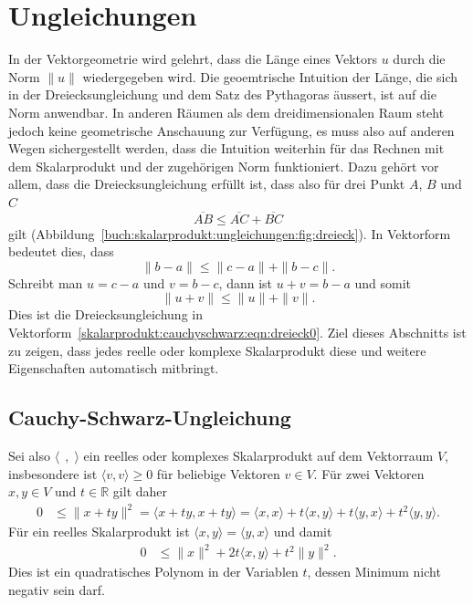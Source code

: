 %
%
%
\section{Ungleichungen
\label{buch:skalarprodukte:section:cauchyschwarz}}

In der Vektorgeometrie wird gelehrt, dass die Länge eines Vektors $u$
durch die Norm $\|u\|$ wiedergegeben wird.
Die geoemtrische Intuition der Länge, die sich in der Dreiecksungleichung
und dem Satz des Pythagoras äussert, ist auf die Norm anwendbar.
In anderen Räumen als dem dreidimensionalen Raum steht
jedoch keine geometrische Anschauung zur Verfügung, es muss also
auf anderen Wegen sichergestellt werden, dass die Intuition weiterhin
für das Rechnen mit dem Skalarprodukt und der zugehörigen Norm
funktioniert.
Dazu gehört vor allem, dass die Dreiecksungleichung erfüllt ist,
dass also für drei Punkt $A$, $B$ und $C$
\begin{equation}
\overline{AB} \le \overline{AC} + \overline{BC}
\label{skalarprodukt:ungleichungen:eqn:dreieck}
\end{equation}
gilt (Abbildung~\ref{buch:skalarprodukt:ungleichungen:fig:dreieck}).
In Vektorform bedeutet dies, dass
\[
\| b-a\|
\le
\| c-a\| + \|b-c\|.
\]
Schreibt man $u=c-a$ und $v=b-c$, dann ist $u+v=b-a$ und somit
\begin{equation}
\| u+v\| \le \|u\| + \|v\|.
\label{skalarprodukt:cauchyschwarz:eqn:dreieck0}
\end{equation}
Dies ist die Dreiecksungleichung in
Vektorform~\eqref{skalarprodukt:cauchyschwarz:eqn:dreieck0}.
Ziel dieses Abschnitts ist zu zeigen, dass jedes reelle oder
komplexe Skalarprodukt diese und weitere Eigenschaften automatisch
mitbringt.

%
%
\subsection{Cauchy-Schwarz-Ungleichung}
Sei also $\langle\;\,,\;\rangle$ ein reelles oder komplexes Skalarprodukt
auf dem Vektorraum $V$,
insbesondere ist $\langle v,v\rangle\ge 0$ für beliebige Vektoren $v\in V$.
Für zwei Vektoren $x,y\in V$ und $t\in \mathbb{R}$  gilt daher
\begin{align}
0
&\le
\| x+ty\|^2
=
\langle x+ty,x+ty\rangle
=
\langle x,x\rangle
+
t\langle x,y\rangle
+
t\langle y,x\rangle
+
t^2
\langle y,y\rangle.
\label{skalarprodukt:cauchyschwarz:eqn:quadrat}
\end{align}
Für ein reelles Skalarprodukt ist $\langle x,y\rangle=\langle y,x\rangle$
und damit
\begin{align}
0
&\le
\|x\|^2 + 2t\langle x,y\rangle + t^2 \|y\|^2.
\label{buch:skalarprodukt:cauchyschwarz:eqn:cspoly}
\end{align}
Dies ist ein quadratisches Polynom in der Variablen $t$, dessen Minimum
nicht negativ sein darf.

